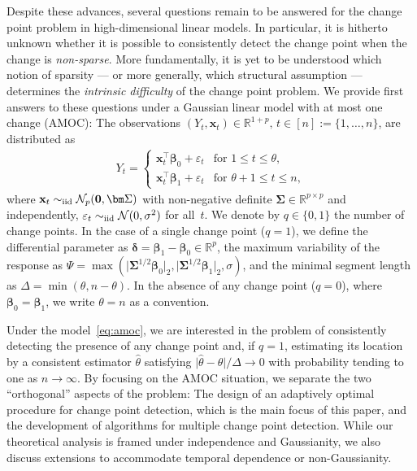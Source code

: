 \documentclass[11pt, a4paper]{article}
\newcommand{\mbf}{\mathbf}
\newcommand{\mc}{\mathcal}
\newcommand{\vep}{\varepsilon}
\def\wh{\widehat}
\newcommand{\cp}{\theta}
\newcommand{\R}{\mathbb{R}}
\newcommand{\iid}{\text{\upshape iid}}
\theoremstyle{definition}
\theoremstyle{definition}
\theoremstyle{definition}
\theoremstyle{definition}
\theoremstyle{definition}
\theoremstyle{remark}
\theoremstyle{definition}
\theoremstyle{definition}
\theoremstyle{definition}
\begin{document}
Despite these advances, several questions remain to be answered for the change point problem in high-dimensional linear models. In particular, it is hitherto unknown whether it is possible to consistently detect the change point when the change is \emph{non-sparse}. More fundamentally, it is yet to be understood which notion of sparsity --- or more generally, which structural assumption --- determines the \emph{intrinsic difficulty} of the change point problem. 
We provide first answers to these questions under a Gaussian linear model with at most one change (AMOC): The observations $(Y_t, \mbf x_t) \in \R^{1+p}, \, t \in [n]:= \{1, \ldots, n\}$, are distributed as 
\begin{align}
\label{eq:amoc}
Y_t = \begin{cases}
\mbf x_t^\top \bm\beta_0 + \vep_t & \text{for \ } 1 \le t \le \cp, \\
\mbf x_t^\top \bm\beta_1 + \vep_t & \text{for \ } \cp + 1 \le t \le n, 
\end{cases}
\end{align}
where $\mbf x_t \sim_{\iid} \mc N_p(\mbf 0, \bm\Sigma)$ with non-negative definite $\bm\Sigma \in \R^{p \times p}$ and independently, $\vep_t \sim_{\iid} \mc N(0, \sigma^2)$ for all~$t$. We denote by $q \in \{0, 1\}$ the number of change points. In the case of a single change point ($q = 1$), we define the differential parameter as $\bm\delta = \bm\beta_1 - \bm\beta_0 \in \R^p$, the maximum variability of the response as $\Psi = \max(\vert \bm\Sigma^{1/2} \bm\beta_0 \vert_2, \vert \bm\Sigma^{1/2} \bm\beta_1 \vert_2, \sigma)$, 
and the minimal segment length as $\Delta = \min(\cp, n - \cp)$. In the absence of any change point ($q = 0$), where $\bm\beta_0 = \bm\beta_1$, we write $\cp = n$ as a convention.

Under the model~\eqref{eq:amoc}, we are interested in the problem of consistently detecting the presence of any change point and, if $q = 1$, estimating its location by a consistent estimator $\wh\cp$ satisfying $\vert \wh\cp - \cp \vert / \Delta \to 0$ with probability tending to one as $n \to \infty$.
By focusing on the AMOC situation, we separate the two \enquote{orthogonal} aspects of the problem: The design of an adaptively optimal procedure for change point detection, which is the main focus of this paper, and the development of algorithms for multiple change point detection. While our theoretical analysis is framed under independence and Gaussianity, we also discuss extensions to accommodate temporal dependence or non-Gaussianity. 
\end{document}
